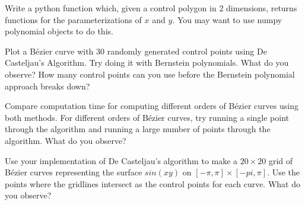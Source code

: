 \begin{problem}
Write a python function which, given a control polygon in $2$ dimensions, returns functions for the parameterizations of $x$ and $y$.
You may want to use numpy polynomial objects to do this.
\end{problem}

\begin{problem}
Plot a B\'{e}zier curve with 30 randomly generated control points using De Casteljau's Algorithm.
Try doing it with Bernstein polynomials.
What do you observe?
How many control points can you use before the Bernstein polynomial approach breaks down?
\end{problem}

\begin{problem}
Compare computation time for computing different orders of B\'{e}zier curves using both methods.
For different orders of B\'{e}zier curves, try running a single point through the algorithm and running a large number of points through the algorithm.
What do you observe?
\end{problem}

\begin{problem}
Use your implementation of De Casteljau's algorithm to make a $20\times 20$ grid of B\'{e}zier curves representing the surface $sin(xy)$ on $[-\pi,\pi]\times [-pi,\pi]$.
Use the points where the gridlines intersect as the control points for each curve.
What do you observe?
\end{problem}
